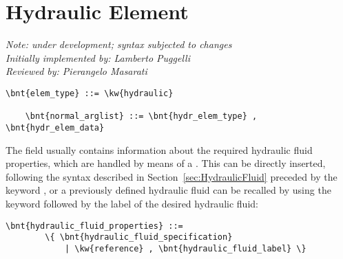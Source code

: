 % 
% 
% 
% 
% 
% 
% 
% 
% 

\section{Hydraulic Element}
\label{sec:EL:HYDR}
{\em 
    Note: under development; syntax subjected to changes \\
    Initially implemented by: Lamberto Puggelli \\
    Reviewed by: Pierangelo Masarati
}

\begin{Verbatim}[commandchars=\\\{\}]
    \bnt{elem_type} ::= \kw{hydraulic}

    \bnt{normal_arglist} ::= \bnt{hydr_elem_type} , \bnt{hydr_elem_data}
\end{Verbatim}
The field  usually contains information
about the required hydraulic fluid properties, which are handled by means of a .
This can be directly inserted, following the syntax described in
Section~\ref{sec:HydraulicFluid} preceded by the keyword , or a
previously defined hydraulic fluid can be recalled by using the keyword 
 followed by the label of the desired hydraulic fluid:
\begin{Verbatim}[commandchars=\\\{\}]
    \bnt{hydraulic_fluid_properties} ::=
        \{ \bnt{hydraulic_fluid_specification}
            | \kw{reference} , \bnt{hydraulic_fluid_label} \}
\end{Verbatim}



